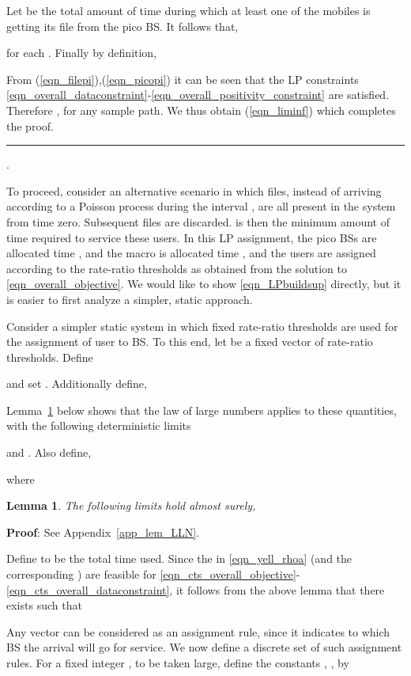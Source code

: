 \documentclass[12pt, draftcls, onecolumn]{IEEEtranTCOM}
\newtheorem{lemma}[theorem]{Lemma}
\newcommand\qed{\hfill \rule{1.2mm}{2.8mm}}
\begin{document}
{Let  be the total amount of
time during which at least one of the  mobiles is getting its file from the pico BS.
It follows that,

for each . Finally by definition,

From (\ref{eqn_filepi}),(\ref{eqn_picopi}) it can be seen that the LP constraints \eqref{eqn_overall_dataconstraint}-\eqref{eqn_overall_positivity_constraint} are satisfied. Therefore
, for any sample path.  We thus obtain
(\ref{eqn_liminf}) which completes the proof. \qed.

To proceed, consider an alternative scenario in which files, instead of arriving according to a Poisson process during the interval , are all present in the system from time zero. Subsequent files are discarded.  is then the minimum amount of time required to service these users. In this LP assignment, the pico BSs are allocated time , and the macro is allocated time , and the users are assigned according to the rate-ratio thresholds as obtained from the solution to \eqref{eqn_overall_objective}. We would like to show \eqref{eqn_LPbuildsup} directly, but it is easier to first analyze a simpler, static approach.


Consider a simpler static system in which fixed rate-ratio thresholds are used for the assignment of user to BS. To this end, let  be a fixed vector of rate-ratio thresholds. Define

and set . Additionally define,

Lemma~\ref{lem_LLN} below shows that the law of large numbers applies to these quantities, with the following deterministic limits

and . Also define,

where


\begin{lemma}
\label{lem_LLN}
The following limits hold almost surely, 
\end{lemma}
{\bf Proof}: See Appendix~\ref{app_lem_LLN}.

Define   to be the total time used. Since the  in \eqref{eqn_yell_rhoa} (and the corresponding ) are feasible for \eqref{eqn_cts_overall_objective}-\eqref{eqn_cts_overall_dataconstraint},  it follows from the above lemma
that there exists  such that 


Any vector  can be considered as an assignment rule, since it indicates to which BS the arrival will go for service. We now define a discrete set  of such assignment rules. For a fixed integer , to be taken large, define the constants , , by

}
\end{document}

